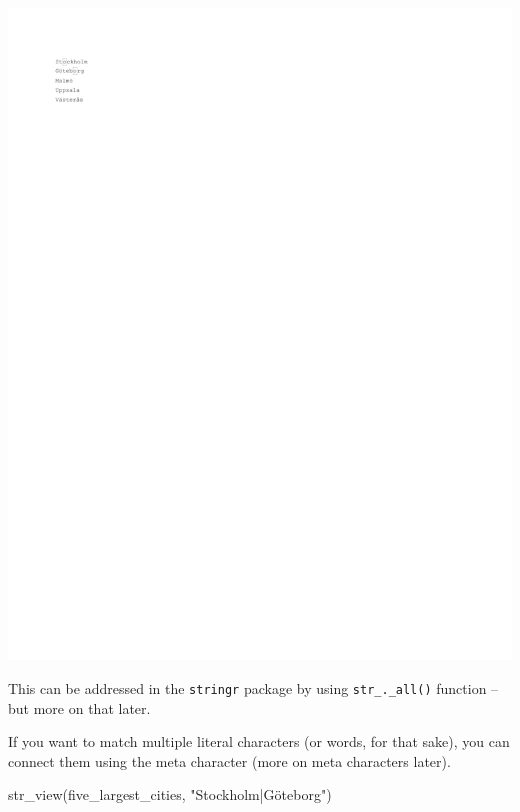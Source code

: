 \documentclass[
]{book}
\newenvironment{Shaded}{\begin{snugshade}}{\end{snugshade}}
\newcommand{\FunctionTok}[1]{\textcolor[rgb]{0.00,0.00,0.00}{#1}}
\newcommand{\NormalTok}[1]{#1}
\newcommand{\StringTok}[1]{\textcolor[rgb]{0.31,0.60,0.02}{#1}}
\begin{document}
\includegraphics{_main_files/figure-latex/unnamed-chunk-20-1.pdf}

This can be addressed in the \texttt{stringr} package by using \texttt{str\_.\_all()} function -- but more on that later.

If you want to match multiple literal characters (or words, for that sake), you can connect them using the \texttt{\textbar{}} meta character (more on meta characters later).

\begin{Shaded}
\begin{Highlighting}[]
\FunctionTok{str\_view}\NormalTok{(five\_largest\_cities, }\StringTok{"Stockholm|Göteborg"}\NormalTok{)}
\end{Highlighting}
\end{Shaded}
\end{document}
